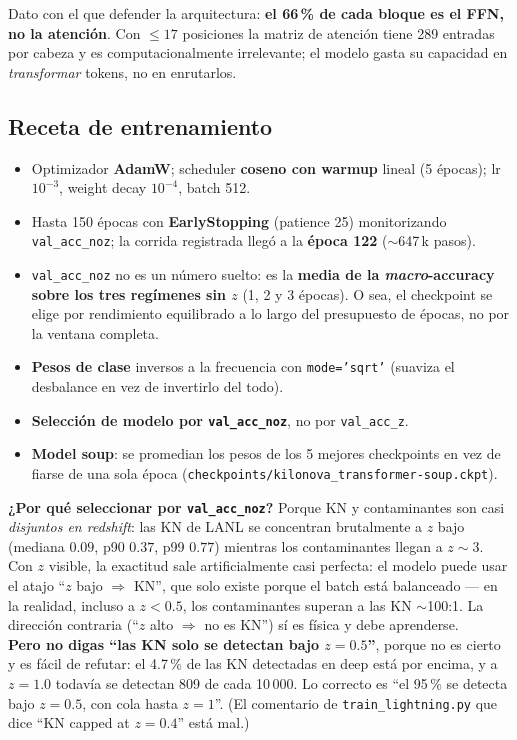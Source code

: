 \documentclass[11pt,a4paper]{article}
\newcommand{\code}[1]{\texttt{\small #1}}
\newlength{\examenpad}
\newenvironment{examen}
  {\par\medskip\noindent
   \begin{lrbox}{\examenbox}%
   \begin{minipage}{\dimexpr\linewidth-2\examenpad}\small}
  {\end{minipage}%
   \end{lrbox}%
   {\setlength{\fboxsep}{\examenpad}\colorbox{boxgray}{\usebox{\examenbox}}}%
   \par\medskip}
\begin{document}
\noindent Dato con el que defender la arquitectura: \textbf{el 66\,\% de cada bloque es el FFN, no la
atención}. Con $\le17$ posiciones la matriz de atención tiene 289 entradas por cabeza y es
computacionalmente irrelevante; el modelo gasta su capacidad en \emph{transformar} tokens, no en
enrutarlos.

\subsection{Receta de entrenamiento}
\begin{itemize}[nosep]
  \item Optimizador \textbf{AdamW}; scheduler \textbf{coseno con warmup} lineal (5 épocas);
        lr $10^{-3}$, weight decay $10^{-4}$, batch 512.
  \item Hasta 150 épocas con \textbf{EarlyStopping} (patience 25) monitorizando \code{val\_acc\_noz};
        la corrida registrada llegó a la \textbf{época 122} ($\sim$647\,k pasos).
  \item \code{val\_acc\_noz} no es un número suelto: es la \textbf{media de la \emph{macro}-accuracy
        sobre los tres regímenes sin $z$} (1, 2 y 3 épocas). O sea, el checkpoint se elige por
        rendimiento equilibrado a lo largo del presupuesto de épocas, no por la ventana completa.
  \item \textbf{Pesos de clase} inversos a la frecuencia con \code{mode='sqrt'} (suaviza el
        desbalance en vez de invertirlo del todo).
  \item \textbf{Selección de modelo por \code{val\_acc\_noz}}, no por \code{val\_acc\_z}.
  \item \textbf{Model soup}: se promedian los pesos de los 5 mejores checkpoints en vez de fiarse de
        una sola época (\code{checkpoints/kilonova\_transformer-soup.ckpt}).
\end{itemize}

\begin{examen}
\textbf{¿Por qué seleccionar por \code{val\_acc\_noz}?} Porque KN y contaminantes son casi
\emph{disjuntos en redshift}: las KN de LANL se concentran brutalmente a $z$ bajo (mediana $0.09$,
p90 $0.37$, p99 $0.77$) mientras los contaminantes llegan a $z\sim3$. Con $z$ visible, la exactitud
sale artificialmente casi perfecta: el modelo
puede usar el atajo ``$z$ bajo $\Rightarrow$ KN'', que solo existe porque el batch está balanceado
--- en la realidad, incluso a $z<0.5$, los contaminantes superan a las KN $\sim$100:1. La dirección
contraria (``$z$ alto $\Rightarrow$ no es KN'') sí es física y debe aprenderse.\\[2pt]
\textbf{Pero no digas ``las KN solo se detectan bajo $z=0.5$''}, porque no es cierto y es fácil de
refutar: el 4.7\,\% de las KN detectadas en deep está por encima, y a $z=1.0$ todavía se detectan
809 de cada 10\,000. Lo correcto es ``el 95\,\% se detecta bajo $z=0.5$, con cola hasta $z=1$''.
(El comentario de \code{train\_lightning.py} que dice ``KN capped at $z=0.4$'' está mal.)
\end{examen}
\end{document}
